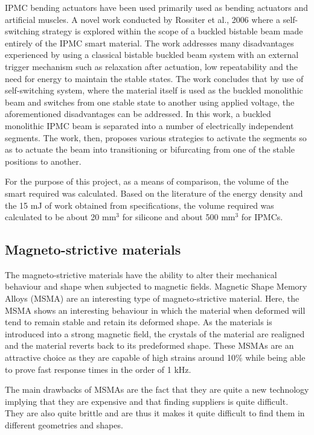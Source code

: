 IPMC bending actuators have been used primarily used as bending actuators and artificial muscles. A novel work conducted by Rossiter et al., 2006\cite{rossiter_self-switching_2006, rossiter_bistable_2006} where a self-switching strategy is explored within the scope of a buckled bistable beam made entirely of the IPMC smart material. The work addresses many disadvantages experienced by using a classical bistable buckled beam system with an external trigger mechanism such as relaxation after actuation, low repeatability and the need for energy to maintain the stable states. The work concludes that by use of self-switching system, where the material itself is used as the buckled monolithic beam and switches from one stable state to another using applied voltage, the aforementioned disadvantages can be addressed. In this work, a buckled monolithic IPMC beam is separated into a number of electrically independent segments. The work, then, proposes various strategies to activate the segments so as to actuate the beam into transitioning or bifurcating from one of the stable positions to another.

For the purpose of this project, as a means of comparison, the volume of the smart required was calculated. Based on the literature of the energy density and the 15 mJ of work obtained from specifications, the volume required was calculated to be about 20 mm$^3$ for silicone and about 500 mm$^3$ for IPMCs.

\subsection{Magneto-strictive materials}
The magneto-strictive materials have the ability to alter their mechanical behaviour and shape when subjected to magnetic fields. Magnetic Shape Memory Alloys (MSMA) are an interesting type of magneto-strictive material. Here, the MSMA shows an interesting behaviour in which the material when deformed will tend to remain stable and retain its deformed shape. As the materials is introduced into a strong magnetic field, the crystals of the material are realigned and the material reverts back to its predeformed shape. These MSMAs are an attractive choice as they are capable of high strains around 10\% while being able to prove fast response times in the order of 1 kHz\cite{faran_ferromagnetic_2016}.

The main drawbacks of MSMAs are the fact that they are quite a new technology implying that they are expensive and that finding suppliers is quite difficult. They are also quite brittle and are thus it makes it quite difficult to find them in different geometries and shapes.

